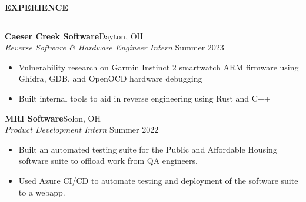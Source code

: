 \documentclass[notitlepage,10pt,a4paper]{article}
\newenvironment{resumesection}[1]{
    \header{#1}
}{}
\newcommand{\header}[1]{
    \vspace{2pt}
    \textcolor{accent1}{\Large \textbf{#1}}
    \vspace{6pt}\hrule\vspace{4pt}
}
\newcommand{\TECH}{
    \textcolor{accent3}{\small\textbf{SKILLS}}\small\,
}
\newcommand{\thingsep}{
    \vspace{4pt}
}
\begin{document}
\begin{resumesection}{EXPERIENCE}
    \textcolor{accent2}{\textbf{\large{Caeser Creek Software}}}\hfill\normalsize Dayton, OH\\
    \textit{Reverse Software \& Hardware Engineer Intern} \hfill\small Summer 2023 
    \begin{itemize}[noitemsep, font=\small, label={-}, leftmargin=*, topsep=0pt, partopsep=0pt]
        \item Vulnerability research on Garmin Instinct 2 smartwatch ARM firmware using Ghidra, GDB, and OpenOCD hardware debugging
        \item Built internal tools to aid in reverse engineering using Rust and C++
    \end{itemize}
    \thingsep

    \textcolor{accent2}{\textbf{\large{MRI Software}}}\hfill\normalsize Solon, OH\\
    \textit{Product Development Intern} \hfill\small Summer 2022
    \begin{itemize}[noitemsep, font=\small, label={-}, leftmargin=*, topsep=0pt, partopsep=0pt]
        \item Built an automated testing suite for the Public and Affordable Housing software suite to offload work from QA engineers.    
        \item Used Azure CI/CD to automate testing and deployment of the software suite to a webapp.
    \end{itemize}
    \thingsep


\end{resumesection}
\end{document}
